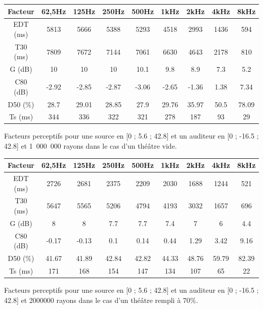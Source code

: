 \begin{tableth} 
 \begin{tabular}{| *{9}{c|}} 
 \hline 
 Facteur & 62,5Hz & 125Hz & 250Hz & 500Hz & 1kHz & 2kHz & 4kHz & 8kHz \\ 
 \hline 
 \hline 
\gls{EDT} (ms)& 5813& 5666& 5388& 5293& 4518& 2993& 1436& 594 \\ 
 \hline 
\gls{T30} (ms)& 7809& 7672& 7144& 7061& 6630& 4643& 2178& 810 \\ 
 \hline  
\gls{G} (dB)& 10& 10& 10& 10.1& 9.8& 8.9& 7.3& 5.2 \\ 
 \hline 
\gls{C80} (dB)& -2.92& -2.85& -2.87& -3.06& -2.65& -1.36& 1.38& 7.34 \\ 
 \hline 
\gls{D50} (\%)& 28.7& 29.01& 28.85& 27.9& 29.76& 35.97& 50.5& 78.09 \\ 
 \hline 
\gls{Ts} (ms)& 344& 336& 322& 321& 278& 187& 93& 29 \\ 
 \hline 
\end{tabular} 
 \caption{Facteurs perceptifs pour une source en [0 ; 5.6 ; 42.8] et un auditeur en [0 ; -16.5 ; 42.8] et 1~000~000 rayons dans le cas d'un théâtre vide.} 
 \label{tab_fac_vide} 
 \end{tableth}
 
 
 \begin{tableth} 
 \begin{tabular}{| *{9}{c|}} 
 \hline 
 Facteur & 62,5Hz & 125Hz & 250Hz & 500Hz & 1kHz & 2kHz & 4kHz & 8kHz \\ 
 \hline 
 \hline 
\gls{EDT} (ms)& 2726& 2681& 2375& 2209& 2030& 1688& 1244& 521 \\ 
 \hline 
\gls{T30} (ms)& 5647& 5565& 5206& 4794& 4193& 3032& 1657& 696 \\ 
 \hline 
\gls{G} (dB)& 8& 8& 7.7& 7.7& 7.4& 7& 6& 4.4 \\ 
 \hline 
\gls{C80} (dB)& -0.17& -0.13& 0.1& 0.14& 0.44& 1.29& 3.42& 9.16 \\ 
 \hline 
\gls{D50} (\%)& 41.67& 41.89& 42.84& 42.82& 44.33& 48.76& 59.79& 82.39 \\ 
 \hline 
\gls{Ts} (ms)& 171& 168& 154& 147& 134& 107& 65& 22 \\ 
 \hline 
\end{tabular} 
 \caption{Facteurs perceptifs pour une source en [0 ; 5.6 ; 42.8] et un auditeur en [0 ; -16.5 ; 42.8] et 2000000 rayons dans le cas d'un théâtre rempli à 70\%.} 
 \label{tab_fac_70} 
 \end{tableth}

